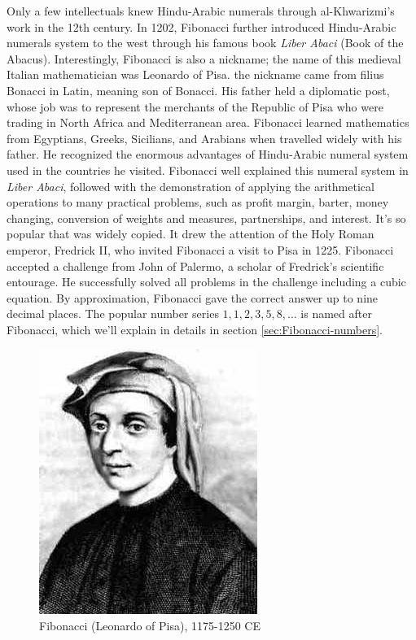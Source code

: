 \documentclass[b5paper]{article}
\begin{document}
Only a few intellectuals knew Hindu-Arabic numerals through al-Khwarizmi's work in the 12th century. In 1202, Fibonacci further introduced Hindu-Arabic numerals system to the west through his famous book {\em Liber Abaci} (Book of the Abacus). Interestingly, Fibonacci is also a nickname; the name of this medieval Italian mathematician was Leonardo of Pisa. the nickname came from filius Bonacci in Latin, meaning son of Bonacci. His father held a diplomatic post, whose job was to represent the merchants of the Republic of Pisa who were trading in North Africa and Mediterranean area. Fibonacci learned mathematics from Egyptians, Greeks, Sicilians, and Arabians when travelled widely with his father. He recognized the enormous advantages of Hindu-Arabic numeral system used in the countries he visited. Fibonacci well explained this numeral system in {\em Liber Abaci}, followed with the demonstration of applying the arithmetical operations to many practical problems, such as profit margin, barter, money changing, conversion of weights and measures, partnerships, and interest. It's so popular that was widely copied. It drew the attention of the Holy Roman emperor, Fredrick II, who invited Fibonacci a visit to Pisa in 1225. Fibonacci accepted a challenge from John of Palermo, a scholar of Fredrick's scientific entourage. He successfully solved all problems in the challenge including a cubic equation. By approximation, Fibonacci gave the correct answer up to nine decimal places\cite{Gies-Carney-24}.  The popular number series $1, 1, 2, 3, 5, 8, \dotsc$ is named after Fibonacci, which we'll explain in details in section \ref{sec:Fibonacci-numbers}.

\begin{figure}[htbp]
 \centering
 \includegraphics[scale=0.35]{img/Fibonacci}
 \caption{Fibonacci (Leonardo of Pisa), 1175-1250 CE}
 \label{fig:Fibonacci}
\end{figure}
\end{document}
